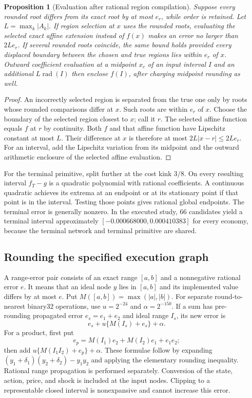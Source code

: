 \documentclass[ecta,nameyear,draft]{econsocart}
\newtheorem{proposition}[theorem]{Proposition}
\theoremstyle{definition}
\theoremstyle{remark}
\begin{document}
\begin{proposition}[Evaluation after rational region compilation]
\label{prop:r41compile}
Suppose every rounded root differs from its exact root by at most $e_r$,
while order is retained. Let $L=\max_k|A_k|$. If region selection at $x$
uses the rounded roots, evaluating the selected exact affine extension
instead of $f(x)$ makes an error no larger than $2Le_r$. If several rounded
roots coincide, the same bound holds provided every displaced boundary
between the chosen and true regions lies within $e_r$ of $x$. Outward
coefficient evaluation at a midpoint $x_c$ of an input interval $I$ and an
additional $L\operatorname{rad}(I)$ then enclose $f(I)$, after charging
midpoint rounding as well.
\end{proposition}
\begin{proof}
An incorrectly selected region is separated from the true one only by
roots whose rounded comparisons differ at $x$. Such roots are within
$e_r$ of $x$. Choose the boundary of the selected region closest to $x$;
call it $r$. The selected affine function equals $f$ at $r$ by continuity.
Both $f$ and that affine function have Lipschitz constant at most $L$.
Their difference at $x$ is therefore at most $2L|x-r|\leq2Le_r$.
For an interval, add the Lipschitz variation from its midpoint and the
outward arithmetic enclosure of the selected affine evaluation.
\end{proof}

For the terminal primitive, split further at the cost kink $3/8$.
On every resulting interval $f_T-g$ is a quadratic polynomial with rational
coefficients. A continuous quadratic achieves its extrema at an endpoint
or at its stationary point if that point is in the interval. Testing those
points gives rational global endpoints. The terminal error is generally
nonzero. In the executed study, 66 candidates yield a terminal interval
approximately $[-0.000668000,0.000410383]$ for every economy, because the
terminal network and terminal primitive are shared.

\subsection{Rounding the specified execution graph}
A range-error pair consists of an exact range $[a,b]$ and a nonnegative
rational error $e$. It means that an ideal node $y$ lies in $[a,b]$ and its
implemented value differs by at most $e$. Put $M([a,b])=\max(|a|,|b|)$.
For separate round-to-nearest binary32 operations, use
$u=2^{-24}$ and $\alpha=2^{-150}$. If a sum has pre-rounding propagated
error $e_s=e_1+e_2$ and ideal range $I_s$, its new error is
\[
 e_s+u\{M(I_s)+e_s\}+\alpha.
\]
For a product, first put
\[
 e_p=M(I_1)e_2+M(I_2)e_1+e_1e_2;
\]
then add $u\{M(I_1I_2)+e_p\}+\alpha$. These formulae follow by expanding
$(y_1+\delta_1)(y_2+\delta_2)-y_1y_2$ and applying the elementary rounding
inequality. Rational range propagation is performed separately. Conversion
of the state, action, price, and shock is included at the input nodes.
Clipping to a representable closed interval is nonexpansive and cannot
increase this error.
\end{document}
